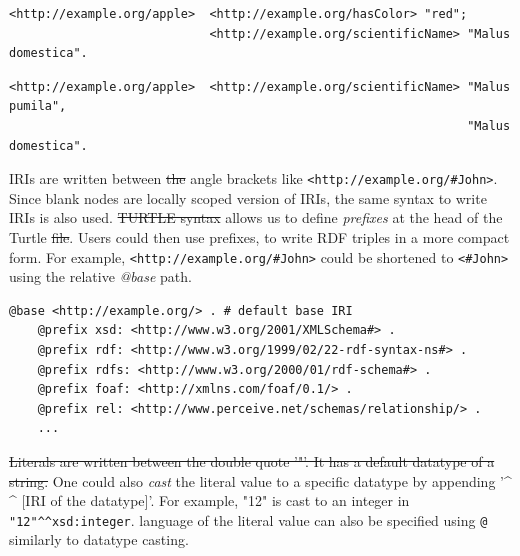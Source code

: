 \begin{lstlisting}[label={lst:same_subject}, 
    caption={Usage of ';' where triples share the same subject.}]
<http://example.org/apple>  <http://example.org/hasColor> "red";
                            <http://example.org/scientificName> "Malus domestica".
\end{lstlisting}

\begin{lstlisting}[label={lst:different_object}, 
    caption={Usage of ',' where triples differs only in the objects.}]
<http://example.org/apple>  <http://example.org/scientificName> "Malus pumila", 
                                                                "Malus domestica".
\end{lstlisting}


IRIs are written between \sout{the} angle brackets like \lstinline{<http://example.org/#John>}.
Since blank nodes are locally scoped version of IRIs, the same syntax to write IRIs is also used.
\sout{TURTLE syntax} allows us to define \textit{prefixes} at the head of the Turtle \sout{file}.
Users could then use prefixes, to write RDF triples in a more compact form. For example,
\lstinline{<http://example.org/#John>} could be shortened to
\lstinline{<#John>} using the relative \textit{@base} path.

\begin{lstlisting}[caption=Prefixes in TURTLE syntax.]
    @base <http://example.org/> . # default base IRI
    @prefix xsd: <http://www.w3.org/2001/XMLSchema#> .
    @prefix rdf: <http://www.w3.org/1999/02/22-rdf-syntax-ns#> .
    @prefix rdfs: <http://www.w3.org/2000/01/rdf-schema#> .
    @prefix foaf: <http://xmlns.com/foaf/0.1/> .
    @prefix rel: <http://www.perceive.net/schemas/relationship/> . 
    ... 
\end{lstlisting}

\sout{Literals are written between the double quote '"'. It has a default datatype of 
a string.}
One could also \textit{cast} the literal value to a specific datatype 
by appending '\textasciicircum{} \textasciicircum{} $[$IRI of the datatype$]$'. For example, 
"12" is cast to an integer in \lstinline{"12"^^xsd:integer}.
 language of the literal value 
can also be specified using \lstinline{@} similarly to datatype casting. 

